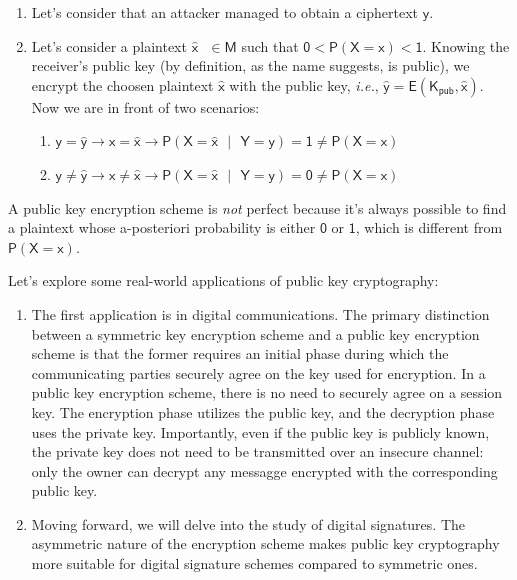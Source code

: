 \documentclass{article}
\newcounter{definition}[section]
\begin{document}
\begin{enumerate}
    \item Let's consider that an attacker managed to obtain a ciphertext $\mathsf{y}$. 
    \item Let's consider a plaintext $\mathsf{\hat{x} \text{ } \in M}$ such that $\mathsf{0 < P(X = x) < 1}$. Knowing the receiver's public key (by definition, as the name suggests, is public), we encrypt the choosen plaintext $\mathsf{\hat{x}}$ with the public key, \textit{i.e.}, $\mathsf{\hat{y} = E(K_{pub}, \hat{x})}$. Now we are in front of two scenarios:
    \begin{enumerate}
        \item $\mathsf{y = \hat{y} \rightarrow x = \hat{x} \rightarrow P(X = \hat{x} \text{ } | \text{ } Y = y) = 1 \neq P(X = x)}$
        \item $\mathsf{y \neq \hat{y} \rightarrow x \neq \hat{x} \rightarrow P(X = \hat{x} \text{ } | \text{ } Y = y) = 0 \neq P(X = x)}$
    \end{enumerate}
\end{enumerate}

A public key encryption scheme is \textit{not} perfect because it's always possible to find a plaintext whose a-posteriori probability is either $\mathsf{0}$ or $\mathsf{1}$, which is different from $\mathsf{P(X=x)}$. \newline

\par \noindent Let's explore some real-world applications of public key cryptography:

\begin{enumerate}
    \item The first application is in digital communications. The primary distinction between a symmetric key encryption scheme and a public key encryption scheme is that the former requires an initial phase during which the communicating parties securely agree on the key used for encryption. In a public key encryption scheme, there is no need to securely agree on a session key. The encryption phase utilizes the public key, and the decryption phase uses the private key. Importantly, even if the public key is publicly known, the private key does not need to be transmitted over an insecure channel: only the owner can decrypt any messagge encrypted with the corresponding public key.
    \item Moving forward, we will delve into the study of digital signatures. The asymmetric nature of the encryption scheme makes public key cryptography more suitable for digital signature schemes compared to symmetric ones.
\end{enumerate}
\end{document}

